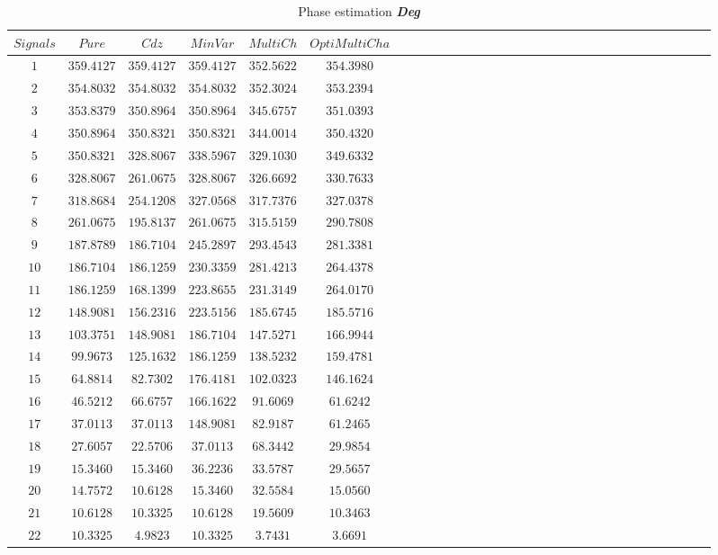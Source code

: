  \begin{table}[!htbp]
\centering
\caption{Phase estimation \textbf{\textit{Deg}}}
\label{table:5}
\begin{tabular}{c c c c c c c c c c c c c c c c c c c c c c c c c c c c c c c } 
   \hline 
$Signals$&$Pure$&$Cdz$&$MinVar$&$MultiCh$&$OptiMultiCha$\\
   \hline 

$1$&$359.4127$&$359.4127$&$359.4127$&$352.5622$&$354.3980$\\
$2$&$354.8032$&$354.8032$&$354.8032$&$352.3024$&$353.2394$\\
$3$&$353.8379$&$350.8964$&$350.8964$&$345.6757$&$351.0393$\\
$4$&$350.8964$&$350.8321$&$350.8321$&$344.0014$&$350.4320$\\
$5$&$350.8321$&$328.8067$&$338.5967$&$329.1030$&$349.6332$\\
$6$&$328.8067$&$261.0675$&$328.8067$&$326.6692$&$330.7633$\\
$7$&$318.8684$&$254.1208$&$327.0568$&$317.7376$&$327.0378$\\
$8$&$261.0675$&$195.8137$&$261.0675$&$315.5159$&$290.7808$\\
$9$&$187.8789$&$186.7104$&$245.2897$&$293.4543$&$281.3381$\\
$10$&$186.7104$&$186.1259$&$230.3359$&$281.4213$&$264.4378$\\
$11$&$186.1259$&$168.1399$&$223.8655$&$231.3149$&$264.0170$\\
$12$&$148.9081$&$156.2316$&$223.5156$&$185.6745$&$185.5716$\\
$13$&$103.3751$&$148.9081$&$186.7104$&$147.5271$&$166.9944$\\
$14$&$ 99.9673$&$125.1632$&$186.1259$&$138.5232$&$159.4781$\\
$15$&$ 64.8814$&$ 82.7302$&$176.4181$&$102.0323$&$146.1624$\\
$16$&$ 46.5212$&$ 66.6757$&$166.1622$&$ 91.6069$&$ 61.6242$\\
$17$&$ 37.0113$&$ 37.0113$&$148.9081$&$82.9187$&$61.2465$\\
$18$&$ 27.6057$&$ 22.5706$&$ 37.0113$&$ 68.3442$&$ 29.9854$\\
$19$&$ 15.3460$&$ 15.3460$&$ 36.2236$&$33.5787$&$ 29.5657$\\
$20$&$ 14.7572$&$ 10.6128$&$ 15.3460$&$ 32.5584$&$15.0560$\\
$21$&$ 10.6128$&$ 10.3325$&$ 10.6128$&$ 19.5609$&$10.3463$\\
$22$&$10.3325$&$  4.9823$&$ 10.3325$&$  3.7431$&$ 3.6691$\\
     \hline 

\end{tabular}
\end{table}
   

